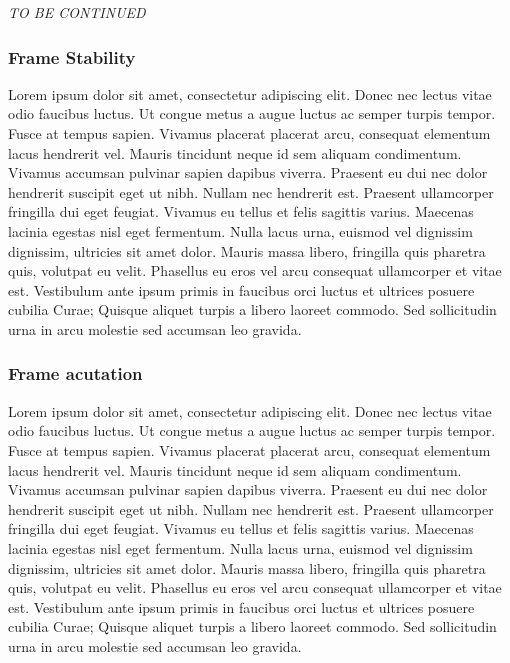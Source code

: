 \documentclass{article}
\begin{document}
\textit{TO BE CONTINUED}

\subsubsection{Frame Stability}
Lorem ipsum dolor sit amet, consectetur adipiscing elit. Donec nec lectus vitae odio faucibus luctus. Ut congue metus a augue luctus ac semper turpis tempor. Fusce at tempus sapien. Vivamus placerat placerat arcu, consequat elementum lacus hendrerit vel. Mauris tincidunt neque id sem aliquam condimentum. Vivamus accumsan pulvinar sapien dapibus viverra. Praesent eu dui nec dolor hendrerit suscipit eget ut nibh. Nullam nec hendrerit est. Praesent ullamcorper fringilla dui eget feugiat. Vivamus eu tellus et felis sagittis varius. Maecenas lacinia egestas nisl eget fermentum. Nulla lacus urna, euismod vel dignissim dignissim, ultricies sit amet dolor. Mauris massa libero, fringilla quis pharetra quis, volutpat eu velit. Phasellus eu eros vel arcu consequat ullamcorper et vitae est. Vestibulum ante ipsum primis in faucibus orci luctus et ultrices posuere cubilia Curae; Quisque aliquet turpis a libero laoreet commodo. Sed sollicitudin urna in arcu molestie sed accumsan leo gravida.

\subsubsection{Frame acutation}
Lorem ipsum dolor sit amet, consectetur adipiscing elit. Donec nec lectus vitae odio faucibus luctus. Ut congue metus a augue luctus ac semper turpis tempor. Fusce at tempus sapien. Vivamus placerat placerat arcu, consequat elementum lacus hendrerit vel. Mauris tincidunt neque id sem aliquam condimentum. Vivamus accumsan pulvinar sapien dapibus viverra. Praesent eu dui nec dolor hendrerit suscipit eget ut nibh. Nullam nec hendrerit est. Praesent ullamcorper fringilla dui eget feugiat. Vivamus eu tellus et felis sagittis varius. Maecenas lacinia egestas nisl eget fermentum. Nulla lacus urna, euismod vel dignissim dignissim, ultricies sit amet dolor. Mauris massa libero, fringilla quis pharetra quis, volutpat eu velit. Phasellus eu eros vel arcu consequat ullamcorper et vitae est. Vestibulum ante ipsum primis in faucibus orci luctus et ultrices posuere cubilia Curae; Quisque aliquet turpis a libero laoreet commodo. Sed sollicitudin urna in arcu molestie sed accumsan leo gravida.
\end{document}
